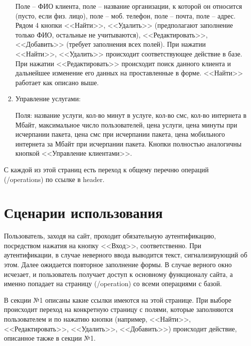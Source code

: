 \documentclass[oneside,senior,etd]{BYUPhysForDegree}
\begin{document}
\begin{enumerate}
    Поле -- ФИО клиента, поле -- название организации, к которой он относится (пусто, если физ. лицо), поле -- моб. телефон, поле -- почта, поле -- адрес. Рядом 4 кнопки <<Найти>>, <<Удалить>> (предполагают заполнение только ФИО, остальные не учитываются), <<Редактировать>>, <<Добавить>> (требует заполнения всех полей). При нажатии <<Найти>>, <<Удалить>> происходит соответствующее действие в базе. При нажатии <<Редактировать>> происходит поиск данного клиента и дальнейшее изменение его данных на проставленные в форме. <<Найти>> работает как описано выше.
    \item Управление услугами:
    
    Поля: название услуги, кол-во минут в услуге, кол-во смс, кол-во интернета в Мбайт, максимальное число пользователей, цена услуги, цена минуты при исчерпании пакета, цена смс при исчерпании пакета, цена мобильного интернета за Мбайт при исчерпании пакета. Кнопки полностью аналогичны кнопкой <<Управление клиентами>>.
\end{enumerate}

С каждой из этой страниц есть переход к общему перечню операций (/operations) по ссылке в header.

\newpage
\section{Сценарии использования}

Пользователь, заходя на сайт, проходит обязательную аутентификацию, посредством нажатия на кнопку <<Вход>>, соответственно. При аутентификации, в случае неверного ввода выводится текст, сигнализирующий об этом. Далее ожидается повторное заполнение формы. В случае верного окно исчезает, и пользователь получает доступ к основному функционалу сайта, а именно попадает на страницу (/operation) со всеми операциями с базой.

В секции №1 описаны какие ссылки имеются на этой странице. При выборе происходит переход на конкретную страницу с полями, которые заполняются пользователем и по нажатию кнопки (например, <<Найти>>, <<Редактировать>>, <<Удалить>>, <<Добавить>>) происходит действие, описанное также в секции №1.
\end{document}
